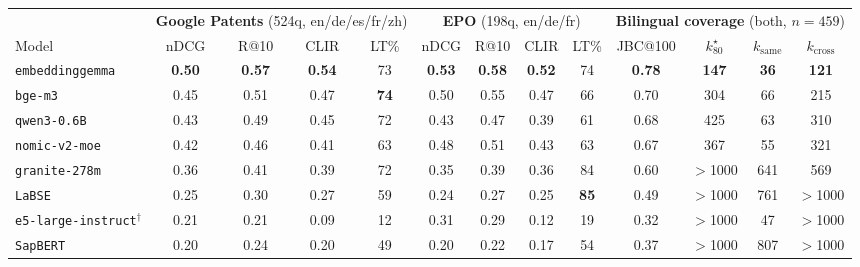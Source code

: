 \begin{table}[t]\centering\small
\setlength{\tabcolsep}{4.5pt}
\begin{tabular}{l cccc cccc cccc}
\toprule
& \multicolumn{4}{c}{\textbf{Google Patents} (524q, en/de/es/fr/zh)} & \multicolumn{4}{c}{\textbf{EPO} (198q, en/de/fr)} & \multicolumn{4}{c}{\textbf{Bilingual coverage} (both, $n{=}459$)} \\
\cmidrule(lr){2-5}\cmidrule(lr){6-9}\cmidrule(lr){10-13}
Model & nDCG & R@10 & CLIR & LT\% & nDCG & R@10 & CLIR & LT\% & JBC@100 & $k^\star_{80}$ & $k_{\mathrm{same}}$ & $k_{\mathrm{cross}}$ \\
\midrule
\texttt{embeddinggemma} & \textbf{0.50} & \textbf{0.57} & \textbf{0.54} & 73 & \textbf{0.53} & \textbf{0.58} & \textbf{0.52} & 74 & \textbf{0.78} & \textbf{147} & \textbf{36} & \textbf{121} \\
\texttt{bge-m3} & 0.45 & 0.51 & 0.47 & \textbf{74} & 0.50 & 0.55 & 0.47 & 66 & 0.70 & 304 & 66 & 215 \\
\texttt{qwen3-0.6B} & 0.43 & 0.49 & 0.45 & 72 & 0.43 & 0.47 & 0.39 & 61 & 0.68 & 425 & 63 & 310 \\
\texttt{nomic-v2-moe} & 0.42 & 0.46 & 0.41 & 63 & 0.48 & 0.51 & 0.43 & 63 & 0.67 & 367 & 55 & 321 \\
\texttt{granite-278m} & 0.36 & 0.41 & 0.39 & 72 & 0.35 & 0.39 & 0.36 & 84 & 0.60 & $>$1000 & 641 & 569 \\
\texttt{LaBSE} & 0.25 & 0.30 & 0.27 & 59 & 0.24 & 0.27 & 0.25 & \textbf{85} & 0.49 & $>$1000 & 761 & $>$1000 \\
\texttt{e5-large-instruct$^\dagger$} & 0.21 & 0.21 & 0.09 & 12 & 0.31 & 0.29 & 0.12 & 19 & 0.32 & $>$1000 & 47 & $>$1000 \\
\texttt{SapBERT} & 0.20 & 0.24 & 0.20 & 49 & 0.20 & 0.22 & 0.17 & 54 & 0.37 & $>$1000 & 807 & $>$1000 \\
\bottomrule
\end{tabular}

\end{table}
